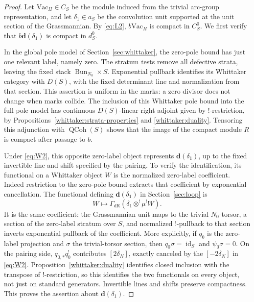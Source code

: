 \begin{proof}
Let \(\mathrm{Vac}_H\in C_S\) be the module induced from the
trivial arc-group representation, and let \(\delta_1\in a_S\)
be the convolution unit supported at the unit section of the
Grassmannian.  By \eqref{eq:L2}, \(b\mathrm{Vac}_H\) is compact
in \(C_S^0\).  We first verify that
\(b\mathbf d(\delta_1)\) is compact in \(d_S^0\).

In the global pole model of Section~\ref{sec:whittaker}, the zero-pole
bound has just one relevant label, namely zero.  The stratum tests
remove all defective strata, leaving the fixed stack
\(\operatorname{Bun}_{N_0}\times S\).  Exponential pullback identifies
its Whittaker category with \(D(S)\), with the fixed determinant line
and normalization from that section.  This assertion is uniform in
the marks: a zero divisor does not change when marks collide.
The inclusion of this Whittaker pole bound into the full pole model
has continuous \(D(S)\)-linear right adjoint given by \(!\)-restriction,
by Propositions~\ref{whittaker:strata-properties} and
\ref{whittaker:duality}.  Tensoring this adjunction with
\(\operatorname{QCoh}(S)\) shows that the image of the compact
module \(R\) is compact after passage to \(b\).

Under \eqref{eq:W2}, this opposite zero-label object represents
\(\mathbf d(\delta_1)\), up to the fixed invertible line and shift
specified by the pairing.  To verify the identification, its
functional on a Whittaker object \(W\) is the normalized zero-label
coefficient.  Indeed restriction to the zero-pole bound extracts that
coefficient by exponential cancellation.  The functional defining
\(\mathbf d(\delta_1)\) in Section~\ref{sec:loop} is
\[
 W\longmapsto
 \Gamma_{\mathrm{dR}}(\delta_1\otimes^!\mu^!W).
\]
It is the same coefficient: the Grassmannian unit maps to the trivial
\(N_0\)-torsor, a section of the zero-label stratum over \(S\),
and normalized \(!\)-pullback to that section inverts exponential
pullback of the coefficient.  More explicitly, if \(q_0\) is the
zero-label projection and \(\sigma\) the trivial-torsor section,
then \(q_0\sigma=\operatorname{id}_S\) and
\(\psi_0\sigma=0\).  On the pairing side,
\(q_{0,*}q_0^!\) contributes \([2\delta_N]\), exactly canceled
by the \([-2\delta_N]\) in \eqref{eq:W2}.
Proposition~\ref{whittaker:duality}
identifies closed inclusion with the transpose of \(!\)-restriction,
so this identifies the two functionals on every object, not just
on standard generators.  Invertible lines and shifts preserve
compactness.  This proves the assertion about
\(\mathbf d(\delta_1)\).


\end{proof}
